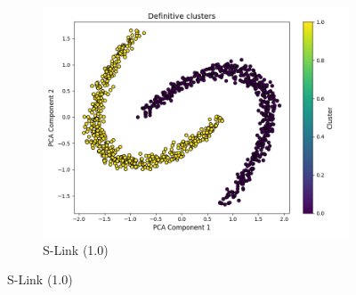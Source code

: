 \documentclass[
	10pt,
	parskip=half-,	
	paper=a4,
	english
	]{scrartcl}
\begin{document}
\begin{figure}[ht]
\begin{subfigure}[b]{0.3\textwidth}
        \includegraphics[width=\textwidth]{../data/plots/synthetic_noise_moons_moons_S-link_structural_0.png}
        \caption{S-Link (1.0)}
    \end{subfigure}
    
    \vspace{0.3cm}
    

\end{figure}
\end{document}
